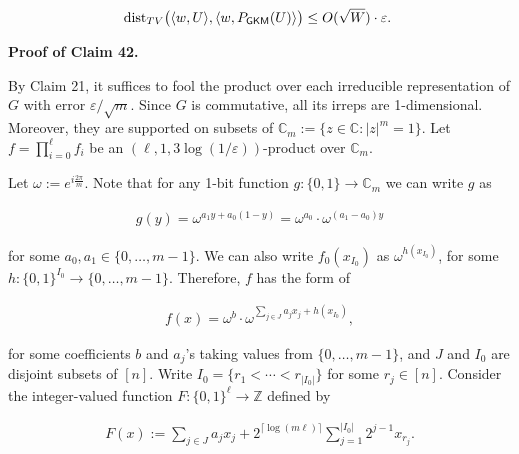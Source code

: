 \[\begin{gathered}
\textnormal{dist}_{TV}\bigl{(}\langle w,U\rangle,\langle w,P_{\mathsf{GKM}}(U)\rangle\bigr{)}\leq O(\sqrt{W})\cdot\varepsilon.\
\end{gathered}\]






\par\medskip\noindent\textbf{Proof of Claim 42.}\par




By Claim 21, it suffices to fool the product over each irreducible representation of $G$ with error $\varepsilon/\sqrt{m}$.
Since $G$ is commutative, all its irreps are 1-dimensional.
Moreover, they are supported on subsets of $\mathbb{C}_{m}:=\{z\in\mathbb{C}:\lvert z\rvert^{m}=1\}$.
Let $f=\prod_{i=0}^{\ell}f_{i}$ be an $(\ell,1,3\log(1/\varepsilon))$-product over $\mathbb{C}_{m}$.\par




Let $\omega:=e^{i\frac{2\pi}{m}}$.
Note that for any 1-bit function $g\colon\{0,1\}\to\mathbb{C}_{m}$ we can write $g$ as\par


\[\begin{gathered}
g(y)=\omega^{a_{1}y+a_{0}(1-y)}=\omega^{a_{0}}\cdot\omega^{(a_{1}-a_{0})y}
\end{gathered}\]


for some $a_{0},a_{1}\in\{0,\ldots,m-1\}$.
We can also write $f_{0}(x_{I_{0}})$ as $\omega^{h(x_{I_{0}})}$, for some $h\colon\{0,1\}^{I_{0}}\to\{0,\ldots,m-1\}$.
Therefore, $f$ has the form of\par


\[\begin{gathered}
f(x)=\omega^{b}\cdot\omega^{\sum_{j\in J}a_{j}x_{j}+h(x_{I_{0}})},
\end{gathered}\]


for some coefficients $b$ and $a_{j}$’s taking values from $\{0,\ldots,m-1\}$, and $J$ and $I_{0}$ are disjoint subsets of $[n]$.
Write $I_{0}=\{r_{1}<\cdots<r_{\lvert I_{0}\rvert}\}$ for some $r_{j}\in[n]$.
Consider the integer-valued function $F\colon\{0,1\}^{\ell}\to\mathbb{Z}$ defined by\par


\[\begin{gathered}
F(x):=\sum_{j\in J}a_{j}x_{j}+2^{\lceil\log(m\ell)\rceil}\sum_{j=1}^{\lvert I_{0}\rvert}2^{j-1}x_{r_{j}}.
\end{gathered}\]


